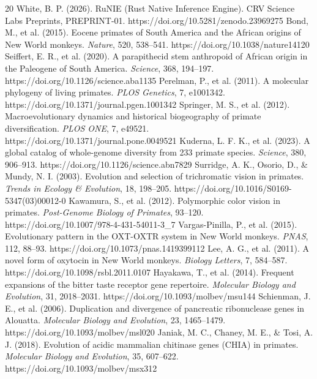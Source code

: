 \documentclass[10pt,letterpaper]{article}
\begin{document}
\begin{thebibliography}{20}
 White, B. P. (2026). RuNIE (Rust Native Inference Engine). CRV Science Labs Preprints, PREPRINT-01. https://doi.org/10.5281/zenodo.23969275
 Bond, M., et al. (2015). Eocene primates of South America and the African origins of New World monkeys. \emph{Nature}, 520, 538--541. https://doi.org/10.1038/nature14120
 Seiffert, E. R., et al. (2020). A parapithecid stem anthropoid of African origin in the Paleogene of South America. \emph{Science}, 368, 194--197. https://doi.org/10.1126/science.aba1135
 Perelman, P., et al. (2011). A molecular phylogeny of living primates. \emph{PLOS Genetics}, 7, e1001342. https://doi.org/10.1371/journal.pgen.1001342
 Springer, M. S., et al. (2012). Macroevolutionary dynamics and historical biogeography of primate diversification. \emph{PLOS ONE}, 7, e49521. https://doi.org/10.1371/journal.pone.0049521
 Kuderna, L. F. K., et al. (2023). A global catalog of whole-genome diversity from 233 primate species. \emph{Science}, 380, 906--913. https://doi.org/10.1126/science.abn7829
 Surridge, A. K., Osorio, D., \& Mundy, N. I. (2003). Evolution and selection of trichromatic vision in primates. \emph{Trends in Ecology \& Evolution}, 18, 198--205. https://doi.org/10.1016/S0169-5347(03)00012-0
 Kawamura, S., et al. (2012). Polymorphic color vision in primates. \emph{Post-Genome Biology of Primates}, 93--120. https://doi.org/10.1007/978-4-431-54011-3_7
 Vargas-Pinilla, P., et al. (2015). Evolutionary pattern in the OXT-OXTR system in New World monkeys. \emph{PNAS}, 112, 88--93. https://doi.org/10.1073/pnas.1419399112
 Lee, A. G., et al. (2011). A novel form of oxytocin in New World monkeys. \emph{Biology Letters}, 7, 584--587. https://doi.org/10.1098/rsbl.2011.0107
 Hayakawa, T., et al. (2014). Frequent expansions of the bitter taste receptor gene repertoire. \emph{Molecular Biology and Evolution}, 31, 2018--2031. https://doi.org/10.1093/molbev/msu144
 Schienman, J. E., et al. (2006). Duplication and divergence of pancreatic ribonuclease genes in Alouatta. \emph{Molecular Biology and Evolution}, 23, 1465--1479. https://doi.org/10.1093/molbev/msl020
 Janiak, M. C., Chaney, M. E., \& Tosi, A. J. (2018). Evolution of acidic mammalian chitinase genes (CHIA) in primates. \emph{Molecular Biology and Evolution}, 35, 607--622. https://doi.org/10.1093/molbev/msx312

\end{thebibliography}
\end{document}
